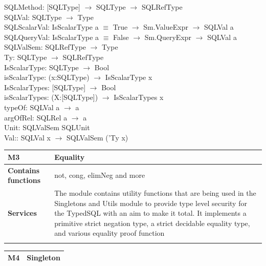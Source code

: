 \documentclass[12pt]{article}
\begin{document}
{{ SQLMethod: [SQLType] $\rightarrow$ SQLType $\rightarrow$ SQLRefType \\
 SQLVal: SQLType $\rightarrow$ Type \\
 
 SQLScalarVal: IsScalarType a $\equiv$ True $\rightarrow$ Sm.ValueExpr 
 $\rightarrow$ SQLVal a \\
 SQLQueryVal: IsScalarType a $\equiv$ False $\rightarrow$ Sm.QueryExpr 
 $\rightarrow$ SQLVal a \\
 
 SQLValSem: SQLRefType $\rightarrow$ Type\\

 
 Ty: SQLType $\rightarrow$ SQLRefType \\

 IsScalarType: SQLType $\rightarrow$ Bool \\
 isScalarType: (x:SQLType) $\rightarrow$ IsScalarType x \\
 IsScalarTypes: [SQLType] $\rightarrow$ Bool \\
 isScalarTypes: (X:[SQLType]) $\rightarrow$ IsScalarTypes x \\
 
 typeOf: SQLVal a $\rightarrow$ a \\
 argOfRel: SQLRel a $\rightarrow$ a\\
 
 Unit: SQLValSem SQLUnit\\
 Val:: SQLVal x $\rightarrow$ SQLValSem ('Ty x)
 
 

{\setlength{\tabcolsep}{6pt} 
    \begin{tabularx}{\textwidth}{>{\bfseries}m{4cm}X}
        M3 & Equality \\ 
        \midrule
        
        Contains functions  &  not, cong, elimNeg and more
        \\	Services &  The module contains utility functions that are being used in the Singletons and Utils module to provide type 		level security for the TypedSQL with an aim to make it total. It implements a primitive strict negation type, a strict decidable equality type,  and various equality proof function
        \\       
        \vspace{12pt}
    \end{tabularx}
    \vspace{3em}
{\setlength{\tabcolsep}{6pt} 
    \begin{tabularx}{\textwidth}{>{\bfseries}m{4cm}X}
        M4 & Singleton \\ 
        \midrule
        

\end{tabularx}}}}}
\end{document}
